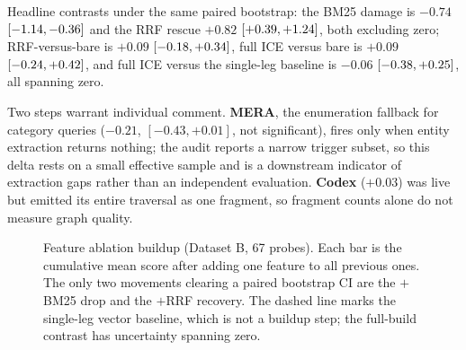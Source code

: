 \documentclass[twoside,11pt]{article}
\begin{document}
Headline contrasts under the same paired bootstrap: the BM25 damage is $-0.74$ $[-1.14,-0.36]$ and the RRF rescue $+0.82$ $[+0.39,+1.24]$, both excluding zero; RRF-versus-bare is $+0.09$ $[-0.18,+0.34]$, full ICE versus bare is $+0.09$ $[-0.24,+0.42]$, and full ICE versus the single-leg baseline is $-0.06$ $[-0.38,+0.25]$, all spanning zero.

Two steps warrant individual comment. \textbf{MERA}, the enumeration fallback for category queries ($-0.21$, $[-0.43,+0.01]$, not significant), fires only when entity extraction returns nothing; the audit reports a narrow trigger subset, so this delta rests on a small effective sample and is a downstream indicator of extraction gaps rather than an independent evaluation. \textbf{Codex} ($+0.03$) was live but emitted its entire traversal as one fragment, so fragment counts alone do not measure graph quality.

\begin{figure}[tbp]
\centering
{}
\caption{Feature ablation buildup (Dataset B, 67 probes). Each bar is the cumulative mean score after adding one feature to all previous ones. The only two movements clearing a paired bootstrap CI are the $+$BM25 drop and the $+$RRF recovery. The dashed line marks the single-leg vector baseline, which is not a buildup step; the full-build contrast has uncertainty spanning zero.}
\label{fig:ablation-waterfall}
\end{figure}
\end{document}

